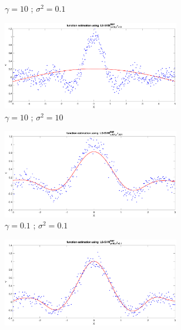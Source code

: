 \begin{figure}[ht]
\begin{subfigure}[b]{0.35\textwidth}
		\caption{$\gamma = 10$ ; $\sigma^2 = 0.1$}\label{fig:Ex_1_2_1_gam(10)_sig(0.1)}
	\end{subfigure}%
	\begin{subfigure}[b]{0.35\textwidth}
		\centering
		\captionsetup{width=0.8\linewidth}
		\includegraphics[width = 0.85\textwidth]{Exercise2/Report/Ex_1_2_1_gam(10)_sig(10)}
		\caption{$\gamma = 10$ ; $\sigma^2 = 10$}\label{fig:Ex_1_2_1_gam(10)_sig(10)}
	\end{subfigure}
	\begin{subfigure}[b]{0.35\textwidth}
		\centering
		\captionsetup{width=0.8\linewidth}
		\includegraphics[width = 0.85\textwidth]{Exercise2/Report/Ex_1_2_1_gam(0.1)_sig(0.1)}
		\caption{$\gamma = 0.1$ ; $\sigma^2 = 0.1$}\label{fig:Ex_1_2_1_gam(0.1)_sig(0.1)}
	\end{subfigure}%
	\begin{subfigure}[b]{0.35\textwidth}
		\centering
		\captionsetup{width=0.8\linewidth}
		\includegraphics[width = 0.85\textwidth]{Exercise2/Report/Ex_1_2_1_gam(10)_sig(0.1)}

\end{subfigure}
\end{figure}
